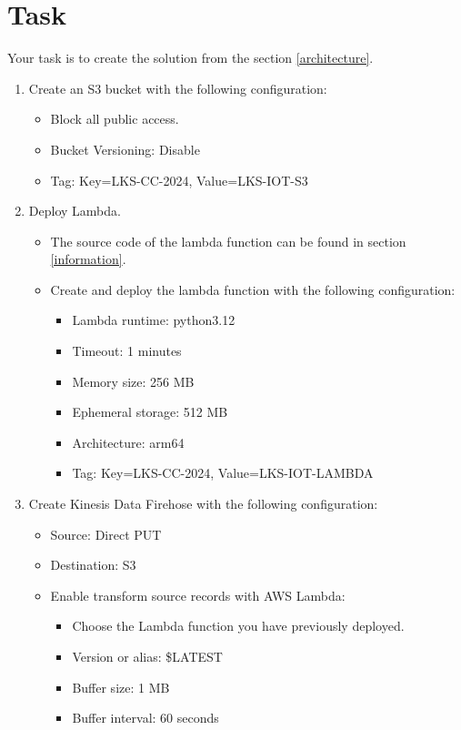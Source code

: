 \documentclass{article}
\begin{document}
\section{Task}
Your task is to create the solution from the section \ref{architecture}.
\begin{enumerate}
\item Create an S3 bucket with the following configuration:
  \begin{itemize}
    \item Block all public access.
    \item Bucket Versioning: Disable
    \item Tag: Key=LKS-CC-2024, Value=LKS-IOT-S3
  \end{itemize}
\item Deploy Lambda.
  \begin{itemize}
    \item The source code of the lambda function can be found in section \ref{information}.
    \item Create and deploy the lambda function with the following configuration:
    \begin{itemize}
      \item Lambda runtime: python3.12
      \item Timeout: 1 minutes
      \item Memory size: 256 MB
      \item Ephemeral storage: 512 MB
      \item Architecture: arm64
      \item Tag: Key=LKS-CC-2024, Value=LKS-IOT-LAMBDA
    \end{itemize}
  \end{itemize}
\item Create Kinesis Data Firehose with the following configuration:
  \begin{itemize}
    \item Source: Direct PUT
    \item Destination: S3
    \item Enable transform source records with AWS Lambda:
    \begin{itemize}
      \item Choose the Lambda function you have previously deployed.
      \item Version or alias: \$LATEST
      \item Buffer size: 1 MB
      \item Buffer interval: 60 seconds
    \end{itemize}

\end{itemize}
\end{enumerate}
\end{document}
